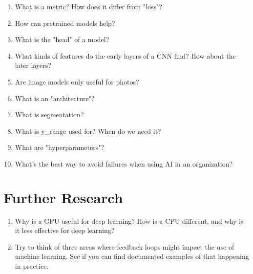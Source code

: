 \documentclass[12pt,a4paper]{article}
\begin{document}
\begin{enumerate}
\bigbreak

\item What is a metric? How does it differ from "loss"? \\

\smallbreak



\item How can pretrained models help? \\

\item What is the "head" of a model? \\

\item What kinds of features do the early layers of a CNN find? How about the later layers? \\

\item Are image models only useful for photos? \\

\item What is an "architecture"? \\

\item What is segmentation? \\

\item What is y\_range used for? When do we need it? \\

\item What are "hyperparameters"? \\

\item What's the best way to avoid failures when using AI in an organization?

\end{enumerate}

\section*{Further Research}

\begin{enumerate}

\item Why is a GPU useful for deep learning? How is a CPU different, and why is it less effective for deep learning? \\

\item Try to think of three areas where feedback loops might impact the use of machine learning. See if you can find documented examples of that happening in practice.
\end{enumerate}
\end{document}
